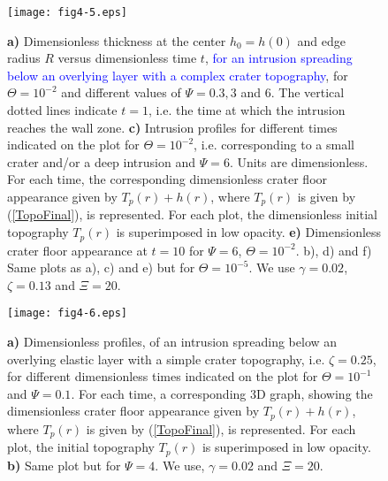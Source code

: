 \begin{article}
\begin{figure}[pb]
\graphicspath{{/Users/thorey/Documents/These/Submission/Article/FFC_JGR_2013/Paper_APRES_2nd_REVIEW/}}
  \centering
  \noindent\texttt{[image: fig4-5.eps]}
  \caption{   \textbf{a)}  Dimensionless   thickness  at   the  center
    $h_0=h(0)$  and edge  radius  $R$ versus  dimensionless time  $t$,
    \textcolor{blue}{for  an intrusion  spreading  below an  overlying
      layer with  a complex  crater topography},  for $\Theta=10^{-2}$
    and different values of $\Psi=0.3, 3$ and $6$. The vertical dotted
    lines indicate $t=1$, i.e. the time at which the intrusion reaches
    the wall zone. \textbf{c)}  Intrusion profiles for different times
    indicated on the plot  for $\Theta=10^{-2}$, i.e. corresponding to
    a small  crater and/or  a deep intrusion  and $\Psi=6$.  Units are
    dimensionless.  For  each  time, the  corresponding  dimensionless
    crater floor appearance given  by $T_p(r)+h(r)$, where $T_p(r)$ is
    given  by (\ref{TopoFinal}),  is represented.  For each  plot, the
    dimensionless initial  topography $T_p(r)$ is superimposed  in low
    opacity.  \textbf{e)}  Dimensionless  crater floor  appearance  at
    $t=10$ for $\Psi=6$, $\Theta=10^{-2}$. b), d) and f) Same plots as
    a),  c) and  e) but  for $\Theta=10^{-5}$.  We use  $\gamma=0.02$,
    $\zeta=0.13$ and $\Xi=20$.}
  \label{fig4-5}
\end{figure}


\begin{figure}[pb]
\graphicspath{{/Users/thorey/Documents/These/Submission/Article/FFC_JGR_2013/Paper_APRES_2nd_REVIEW/}}
  \centering
  \noindent\texttt{[image: fig4-6.eps]}
  \caption{  \textbf{a)}  Dimensionless   profiles,  of  an  intrusion
    spreading below  an overlying elastic  layer with a  simple crater
    topography, i.e.  $\zeta=0.25$, for different  dimensionless times
    indicated  on the  plot for  $\Theta=10^{-1}$ and  $\Psi=0.1$. For
    each  time, a  corresponding 3D  graph, showing  the dimensionless
    crater floor appearance given  by $T_p(r)+h(r)$, where $T_p(r)$ is
    given  by (\ref{TopoFinal}),  is represented.  For each  plot, the
    initial    topography   $T_p(r)$    is    superimposed   in    low
    opacity.  \textbf{b)}   Same  plot  but  for   $\Psi=4$.  We  use,
    $\gamma=0.02$ and $\Xi=20$.}
  \label{fig4-6}
\end{figure}




\end{article}

